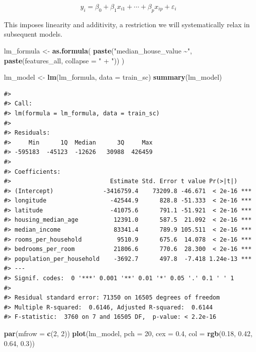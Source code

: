 \documentclass[
]{article}
\newenvironment{Shaded}{\begin{snugshade}}{\end{snugshade}}
\newcommand{\AttributeTok}[1]{\textcolor[rgb]{0.13,0.29,0.53}{#1}}
\newcommand{\DecValTok}[1]{\textcolor[rgb]{0.00,0.00,0.81}{#1}}
\newcommand{\FloatTok}[1]{\textcolor[rgb]{0.00,0.00,0.81}{#1}}
\newcommand{\FunctionTok}[1]{\textcolor[rgb]{0.13,0.29,0.53}{\textbf{#1}}}
\newcommand{\NormalTok}[1]{#1}
\newcommand{\OtherTok}[1]{\textcolor[rgb]{0.56,0.35,0.01}{#1}}
\newcommand{\StringTok}[1]{\textcolor[rgb]{0.31,0.60,0.02}{#1}}
\begin{document}
\[y_i = \beta_0 + \beta_1 x_{i1} + \cdots + \beta_p x_{ip} + \varepsilon_i\]

This imposes linearity and additivity, a restriction we will
systematically relax in subsequent models.

\begin{Shaded}
\begin{Highlighting}[]
\NormalTok{lm\_formula }\OtherTok{\textless{}{-}} \FunctionTok{as.formula}\NormalTok{(}
  \FunctionTok{paste}\NormalTok{(}\StringTok{"median\_house\_value \textasciitilde{}"}\NormalTok{, }\FunctionTok{paste}\NormalTok{(features\_all, }\AttributeTok{collapse =} \StringTok{" + "}\NormalTok{))}
\NormalTok{)}

\NormalTok{lm\_model }\OtherTok{\textless{}{-}} \FunctionTok{lm}\NormalTok{(lm\_formula, }\AttributeTok{data =}\NormalTok{ train\_sc)}
\FunctionTok{summary}\NormalTok{(lm\_model)}
\end{Highlighting}
\end{Shaded}

\begin{verbatim}
#> 
#> Call:
#> lm(formula = lm_formula, data = train_sc)
#> 
#> Residuals:
#>     Min      1Q  Median      3Q     Max 
#> -595183  -45123  -12626   30988  426459 
#> 
#> Coefficients:
#>                            Estimate Std. Error t value Pr(>|t|)    
#> (Intercept)              -3416759.4    73209.8 -46.671  < 2e-16 ***
#> longitude                  -42544.9      828.8 -51.333  < 2e-16 ***
#> latitude                   -41075.6      791.1 -51.921  < 2e-16 ***
#> housing_median_age          12391.0      587.5  21.092  < 2e-16 ***
#> median_income               83341.4      789.9 105.511  < 2e-16 ***
#> rooms_per_household          9510.9      675.6  14.078  < 2e-16 ***
#> bedrooms_per_room           21806.6      770.6  28.300  < 2e-16 ***
#> population_per_household    -3692.7      497.8  -7.418 1.24e-13 ***
#> ---
#> Signif. codes:  0 '***' 0.001 '**' 0.01 '*' 0.05 '.' 0.1 ' ' 1
#> 
#> Residual standard error: 71350 on 16505 degrees of freedom
#> Multiple R-squared:  0.6146, Adjusted R-squared:  0.6144 
#> F-statistic:  3760 on 7 and 16505 DF,  p-value: < 2.2e-16
\end{verbatim}

\begin{Shaded}
\begin{Highlighting}[]
\FunctionTok{par}\NormalTok{(}\AttributeTok{mfrow =} \FunctionTok{c}\NormalTok{(}\DecValTok{2}\NormalTok{, }\DecValTok{2}\NormalTok{))}
\FunctionTok{plot}\NormalTok{(lm\_model, }\AttributeTok{pch =} \DecValTok{20}\NormalTok{, }\AttributeTok{cex =} \FloatTok{0.4}\NormalTok{, }\AttributeTok{col =} \FunctionTok{rgb}\NormalTok{(}\FloatTok{0.18}\NormalTok{, }\FloatTok{0.42}\NormalTok{, }\FloatTok{0.64}\NormalTok{, }\FloatTok{0.3}\NormalTok{))}
\end{Highlighting}
\end{Shaded}
\end{document}
